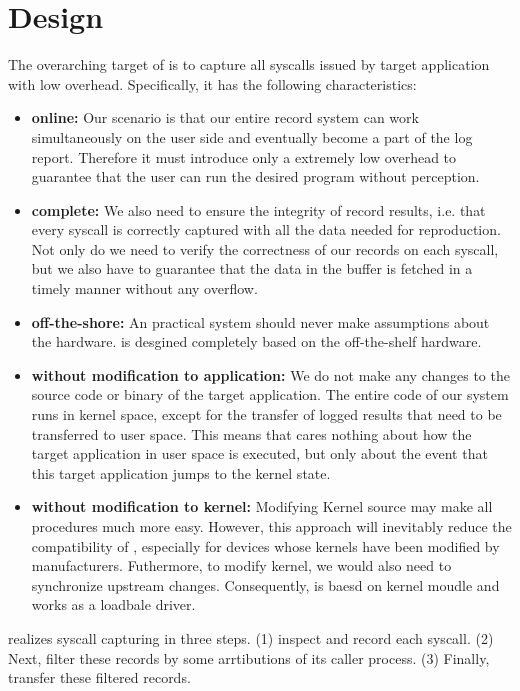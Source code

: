 \section{Design}
The overarching target of \TheName is to capture all syscalls issued by target application with low overhead. Specifically, it has the following characteristics:

\begin{itemize}
    \item \textbf{online:} Our scenario is that our entire record system can  work simultaneously on the user side and eventually become a part of the log report. Therefore it must introduce only a extremely low overhead to guarantee that the user can run the desired program without perception.
    \item \textbf{complete:} We also need to ensure the integrity of record results, i.e. that every syscall is correctly captured with all the data needed for reproduction. Not only do we need to verify the correctness of our records on each syscall, but we also have to guarantee that the data in the buffer is fetched in a timely manner without any overflow.
    \item \textbf{off-the-shore:} An practical system should never make assumptions about the hardware. \TheName is desgined completely based on the off-the-shelf hardware.
    \item \textbf{without modification to application:} We do not make any changes to the source code or binary of the target application. The entire code of our system runs in kernel space, except for the transfer of logged results that need to be transferred to user space. This means that \TheName cares nothing about how the target application in user space is executed, but only about the event that this target application jumps to the kernel state.
    \item \textbf{without modification to kernel:} Modifying Kernel source may make all procedures much more easy. However, this approach will inevitably reduce the compatibility of \TheName, especially for devices whose kernels have been modified by manufacturers. Futhermore, to modify kernel, we would also need to synchronize upstream changes. Consequently, \TheName is baesd on kernel moudle and works as a loadbale driver.
\end{itemize}


\TheName realizes syscall capturing in three steps. (1) \TheName inspect and record each syscall. (2) Next, \TheName filter these records by some arrtibutions of its caller process. (3) Finally, \TheName transfer these filtered records.




